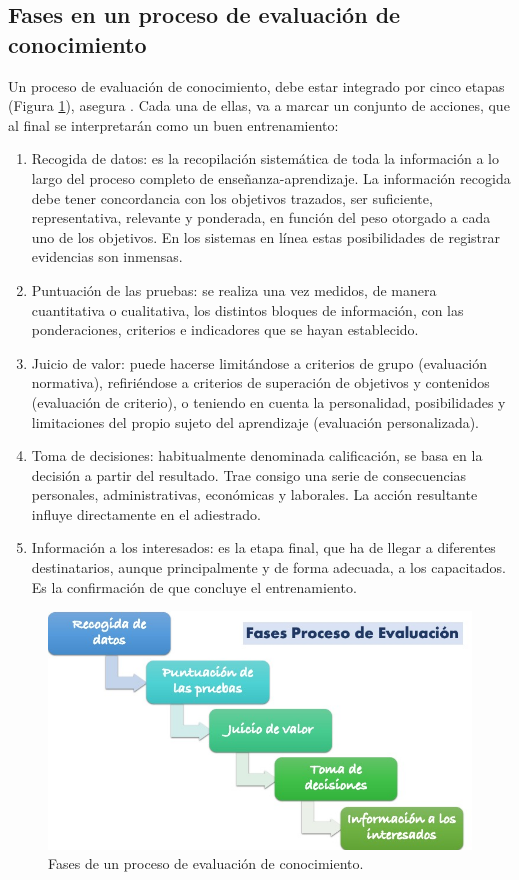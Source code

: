 \subsection{Fases en un proceso de evaluación de conocimiento}
Un proceso de evaluación de conocimiento, debe estar integrado por cinco etapas (Figura \ref{fig:etapasEval}), asegura \cite{EtapasEntrenamiento}. Cada una de ellas, va a marcar un conjunto de acciones, que al final se interpretarán como un buen entrenamiento:

\begin{enumerate}
\item Recogida de datos: es la recopilación sistemática de toda la información a lo largo del proceso completo de enseñanza-aprendizaje. La información recogida debe tener concordancia con los objetivos trazados, ser suficiente, representativa, relevante y ponderada, en función del peso otorgado a cada uno de los objetivos. En los sistemas en línea estas posibilidades de registrar evidencias son inmensas.
\item Puntuación de las pruebas: se realiza una vez medidos, de manera cuantitativa o cualitativa, los distintos bloques de información, con las ponderaciones, criterios e indicadores que se hayan establecido.
\item Juicio de valor: puede hacerse limitándose a criterios de grupo (evaluación normativa), refiriéndose a criterios de superación de objetivos y contenidos (evaluación de criterio), o teniendo en cuenta la personalidad, posibilidades y limitaciones del propio sujeto del aprendizaje (evaluación personalizada).
\item Toma de decisiones: habitualmente denominada calificación, se basa en la decisión a partir del resultado. Trae consigo una serie de consecuencias personales, administrativas, económicas y laborales. La acción resultante influye directamente en el adiestrado.
\item Información a los interesados: es la etapa final, que ha de llegar a diferentes destinatarios, aunque principalmente y de forma adecuada, a los capacitados. Es la confirmación de que concluye el entrenamiento.
\end{enumerate}

\begin{figure}[h]
\centering
 \includegraphics[width=0.5\linewidth]{imagen/FasesEva.jpg}
 \caption{Fases de un proceso de evaluación de conocimiento.}
 \label{fig:etapasEval} 
\end{figure}

